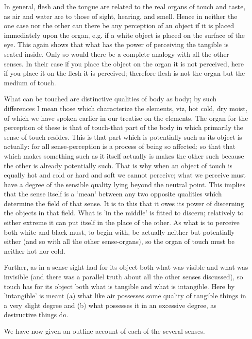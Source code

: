 In general, flesh and the tongue are related to the real organs of
touch and taste, as air and water are to those of sight, hearing,
and smell. Hence in neither the one case nor the other can there be
any perception of an object if it is placed immediately upon the organ,
e.g. if a white object is placed on the surface of the eye. This again
shows that what has the power of perceiving the tangible is seated
inside. Only so would there be a complete analogy with all the other
senses. In their case if you place the object on the organ it is not
perceived, here if you place it on the flesh it is perceived; therefore
flesh is not the organ but the medium of touch. 

What can be touched are distinctive qualities of body as body; by
such differences I mean those which characterize the elements, viz,
hot cold, dry moist, of which we have spoken earlier in our treatise
on the elements. The organ for the perception of these is that of
touch-that part of the body in which primarily the sense of touch
resides. This is that part which is potentially such as its object
is actually: for all sense-perception is a process of being so affected;
so that that which makes something such as it itself actually is makes
the other such because the other is already potentially such. That
is why when an object of touch is equally hot and cold or hard and
soft we cannot perceive; what we perceive must have a degree of the
sensible quality lying beyond the neutral point. This implies that
the sense itself is a 'mean' between any two opposite qualities which
determine the field of that sense. It is to this that it owes its
power of discerning the objects in that field. What is 'in the middle'
is fitted to discern; relatively to either extreme it can put itself
in the place of the other. As what is to perceive both white and black
must, to begin with, be actually neither but potentially either (and
so with all the other sense-organs), so the organ of touch must be
neither hot nor cold. 

Further, as in a sense sight had for its object both what was visible
and what was invisible (and there was a parallel truth about all the
other senses discussed), so touch has for its object both what is
tangible and what is intangible. Here by 'intangible' is meant (a)
what like air possesses some quality of tangible things in a very
slight degree and (b) what possesses it in an excessive degree, as
destructive things do. 

We have now given an outline account of each of the several senses.

